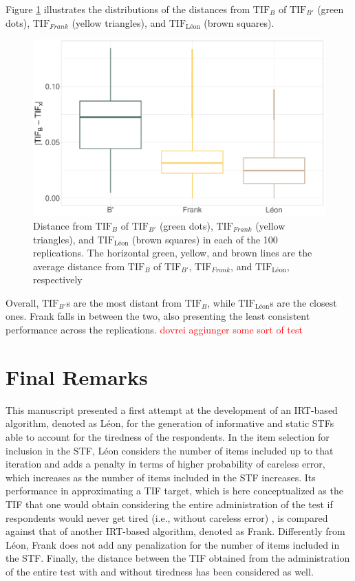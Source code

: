 \documentclass{svproc}
\newcommand{\ottavia}[1]{\textcolor{red}{#1}}
\begin{document}
Figure \ref{fig:points-alogirthms} illustrates the distributions of the distances from $\text{TIF}_B$ of  $\text{TIF}_{B'}$ (green dots), $\text{TIF}_{Frank}$ (yellow triangles), and $\text{TIF}_{\text{Léon}}$ (brown squares).
\begin{figure}[!h]
	\centering
	\includegraphics[width=\linewidth]{img/box-plot-alogirthms}
	\caption{Distance from $\text{TIF}_{B}$ of $\text{TIF}_{B'}$ (green dots), $\text{TIF}_{Frank}$ (yellow triangles), and $\text{TIF}_{\text{Léon}}$ (brown squares) in each of the 100 replications. The horizontal green, yellow, and brown lines are the average distance from $\text{TIF}_B$ of $\text{TIF}_{B'}$, $\text{TIF}_{Frank}$, and $\text{TIF}_{\text{Léon}}$, respectively}
	\label{fig:points-alogirthms}
\end{figure}

Overall, $\text{TIF}_{B'}$s are the most distant from $\text{TIF}_B$, while $\text{TIF}_{\text{Léon}}$s are the closest ones. Frank falls in between the two, also presenting the least consistent performance across the replications. \ottavia{dovrei aggiunger some sort of test}

\section{Final Remarks}

This manuscript presented a first attempt at the development of an IRT-based algorithm, denoted as Léon, for the generation of informative and static STFs able to account for the tiredness of the respondents. In the item selection for inclusion in the STF, Léon considers the number of items included up to that iteration and adds a penalty in terms of higher probability of careless error, which increases as the number of items included in the STF increases. Its performance in approximating a TIF target, which is here conceptualized as the TIF that one would obtain considering the entire administration of the test if respondents would never get tired (i.e., without careless error) , is compared against that of another IRT-based algorithm, denoted as Frank. Differently from Léon, Frank does not add any penalization for the number of items included in the STF. Finally, the distance between the TIF obtained from the administration of the entire test with and without tiredness has been considered as well. 
\end{document}

